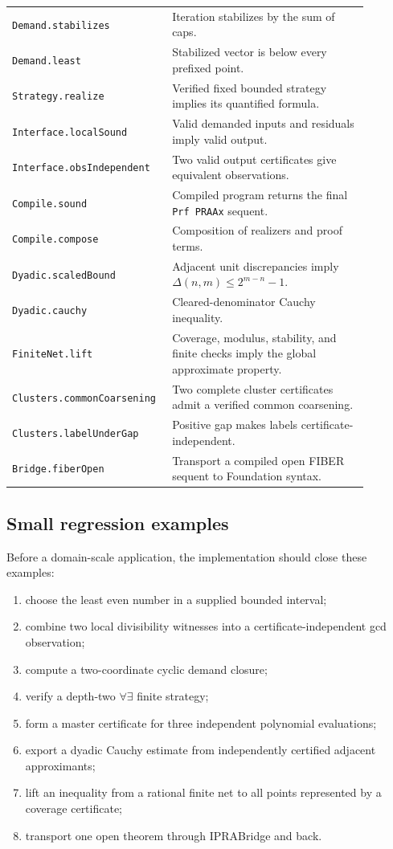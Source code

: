 \begin{longtable}{Y{0.35\linewidth}Y{0.53\linewidth}}
\texttt{Demand.stabilizes} & Iteration stabilizes by the sum of caps.\\
\texttt{Demand.least} & Stabilized vector is below every prefixed point.\\
\texttt{Strategy.realize} & Verified fixed bounded strategy implies its quantified formula.\\
\texttt{Interface.localSound} & Valid demanded inputs and residuals imply valid output.\\
\texttt{Interface.obsIndependent} & Two valid output certificates give equivalent observations.\\
\texttt{Compile.sound} & Compiled program returns the final \texttt{Prf PRAAx} sequent.\\
\texttt{Compile.compose} & Composition of realizers and proof terms.\\
\texttt{Dyadic.scaledBound} & Adjacent unit discrepancies imply \(\Delta(n,m)\le2^{m-n}-1\).\\
\texttt{Dyadic.cauchy} & Cleared-denominator Cauchy inequality.\\
\texttt{FiniteNet.lift} & Coverage, modulus, stability, and finite checks imply the global approximate property.\\
\texttt{Clusters.commonCoarsening} & Two complete cluster certificates admit a verified common coarsening.\\
\texttt{Clusters.labelUnderGap} & Positive gap makes labels certificate-independent.\\
\texttt{Bridge.fiberOpen} & Transport a compiled open FIBER sequent to Foundation syntax.\\
\bottomrule
\end{longtable}
\normalsize

\subsection{Small regression examples}

Before a domain-scale application, the implementation should close these
examples:

\begin{enumerate}
\item choose the least even number in a supplied bounded interval;
\item combine two local divisibility witnesses into a certificate-independent
      gcd observation;
\item compute a two-coordinate cyclic demand closure;
\item verify a depth-two \(\forall\exists\) finite strategy;
\item form a master certificate for three independent polynomial evaluations;
\item export a dyadic Cauchy estimate from independently certified adjacent
      approximants;
\item lift an inequality from a rational finite net to all points represented
      by a coverage certificate;
\item transport one open theorem through IPRABridge and back.
\end{enumerate}
